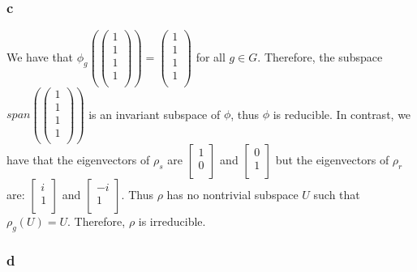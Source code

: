 \documentclass[]{article}
\begin{document}
\subsubsection*{c}
We have that $\phi_g (
\begin{pmatrix}
	1\\
	1\\
	1\\
	1\\
\end{pmatrix}
) = \begin{pmatrix}
	1\\
	1\\
	1\\
	1\\
\end{pmatrix}$ for all $g \in G$. Therefore, the subspace $span(\begin{pmatrix}
1\\
1\\
1\\
1\\
\end{pmatrix})$ is an invariant subspace of $\phi$, thus $\phi$ is reducible. In contrast, we have that the eigenvectors of $\rho_{s}$ are $
\begin{bmatrix}
	1\\
	0\\
\end{bmatrix}$ and 
$
\begin{bmatrix}
	0\\
	1\\
\end{bmatrix}
$
but the eigenvectors of $\rho_r$ are:
$\begin{bmatrix}
	i\\
	1\\
\end{bmatrix}$
and 
$\begin{bmatrix}
	-i\\
	1\\
\end{bmatrix}$. Thus $\rho$ has no nontrivial subspace $U$ such that $\rho_g (U) = U$. Therefore, $\rho$ is irreducible. 
\subsubsection*{d}
\end{document}

